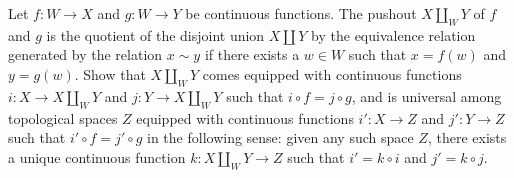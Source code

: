 \begin{exercise}
  Let \(f\colon W\to X\) and \(g\colon W\to Y\) be continuous
  functions. The pushout \(X\amalg_W Y\) of \(f\) and \(g\) is the
  quotient of the disjoint union \(X\amalg Y\) by the equivalence relation
  generated by the relation \(x\sim y\) if there exists a \(w\in W\) such
  that \(x=f(w)\) and \(y=g(w)\). Show that \(X\amalg_W Y\) comes equipped
  with continuous functions \(i\colon X\to X\amalg_W Y\) and
  \(j\colon Y\to X\amalg_W Y\) such that \(i\circ f=j\circ g\), and is
  universal among topological spaces \(Z\) equipped with continuous
  functions \(i'\colon X\to Z\) and \(j'\colon Y\to Z\) such that
  \(i'\circ f=j'\circ g\) in the following sense: given any such space
  \(Z\), there exists a unique continuous function
  \(k\colon X\amalg_W Y\to Z\) such that \(i'=k\circ i\) and \(j'=k\circ
  j\).
\end{exercise}
\begin{solution}
\end{solution}


